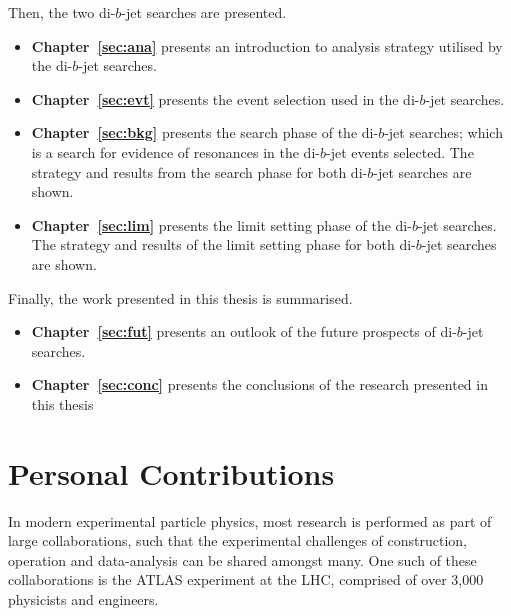 \noindent
Then, the two di-$b$-jet searches are presented. %
\vspace{-0.5em}
\begin{itemize}[leftmargin=*]
\item\textbf{Chapter~\ref{sec:ana}} presents an introduction to analysis strategy utilised by the \mbox{di-$b$-jet} searches.
\item\textbf{Chapter~\ref{sec:evt}} presents the event selection used in the \mbox{di-$b$-jet} searches.
\item\textbf{Chapter~\ref{sec:bkg}} presents the search phase of the di-$b$-jet searches;
  which is a search for evidence of resonances in the di-$b$-jet events selected.
  The strategy and results from the search phase for both di-$b$-jet searches are shown.%
\item\textbf{Chapter~\ref{sec:lim}} presents the limit setting phase of the di-$b$-jet searches.
  The strategy and results of the limit setting phase for both di-$b$-jet searches are shown.%
\end{itemize}

\noindent
Finally, the work presented in this thesis is summarised.
\vspace{-0.5em}
  \begin{itemize}[leftmargin=*]
\item\textbf{Chapter~\ref{sec:fut}} presents an outlook of the future prospects of di-$b$-jet searches.%
\item\textbf{Chapter~\ref{sec:conc}} presents the conclusions of the research presented in this thesis%
\end{itemize}
\clearpage
\section{Personal Contributions}

\vspace{-0.5em}
In modern experimental particle physics, most research is performed as part of large collaborations,
such that the experimental challenges of construction, operation and data-analysis can be shared amongst many.
One such of these collaborations is the ATLAS experiment at the LHC, comprised of over 3,000 physicists and engineers.

